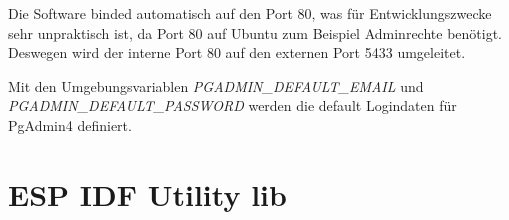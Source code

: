 Die Software binded automatisch auf den Port 80, was für Entwicklungszwecke sehr unpraktisch ist, da Port 80 auf Ubuntu zum Beispiel Adminrechte benötigt. Deswegen wird der interne Port 80 auf den externen Port 5433 umgeleitet.

Mit den Umgebungsvariablen \textit{PGADMIN\_DEFAULT\_EMAIL} und 
\textit{PGADMIN\_DEFAULT\_PASSWORD} werden die default Logindaten für PgAdmin4 definiert. 

\section{ESP IDF Utility lib}\label{sec:esp-idf-utility-lib}

